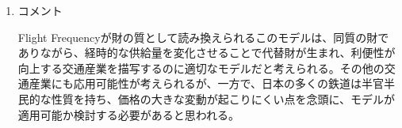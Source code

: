 \documentclass{jsarticle}
\begin{document}
\begin{enumerate}
\begin{itemize}
 \end{itemize}
 
 
 
\item コメント

Flight Frequencyが財の質として読み換えられるこのモデルは、同質の財でありながら、経時的な供給量を変化させることで代替財が生まれ、利便性が向上する交通産業を描写するのに適切なモデルだと考えられる。その他の交通産業にも応用可能性が考えられるが、一方で、日本の多くの鉄道は半官半民的な性質を持ち、価格の大きな変動が起こりにくい点を念頭に、モデルが適用可能か検討する必要があると思われる。

\end{enumerate}
\end{document}

